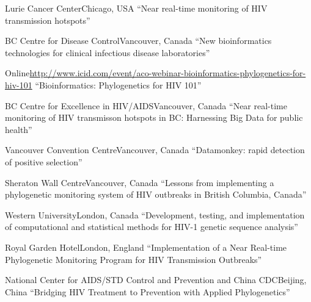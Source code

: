 \documentclass[11pt]{moderncv}
\begin{document}
{}

{Lurie Cancer Center}{Chicago, USA}
{``Near real-time monitoring of HIV transmission hotspots''}

{BC Centre for Disease Control}{Vancouver, Canada}
{``New bioinformatics technologies for clinical infectious disease laboratories''}

{Online}{\url{http://www.icid.com/event/aco-webinar-bioinformatics-phylogenetics-for-hiv-101}}
{``Bioinformatics: Phylogenetics for HIV 101''}

{BC Centre for Excellence in HIV/AIDS}{Vancouver, Canada}
{``Near real-time monitoring of HIV transmisson hotspots in BC: Harnessing Big Data for public health''}

{Vancouver Convention Centre}{Vancouver, Canada}
{``Datamonkey: rapid detection of positive selection''}

{Sheraton Wall Centre}{Vancouver, Canada}
{``Lessons from implementing a phylogenetic monitoring system of HIV outbreaks in British Columbia, Canada''}

{Western University}{London, Canada}
{``Development, testing, and implementation of computational and statistical methods for HIV-1 genetic sequence analysis''}

{Royal Garden Hotel}{London, England}
{``Implementation of a Near Real-time Phylogenetic Monitoring Program for HIV Transmission Outbreaks''}

{National Center for AIDS/STD Control and Prevention and China CDC}{Beijing, China}
{``Bridging HIV Treatment to Prevention with Applied Phylogenetics''}
\end{document}
